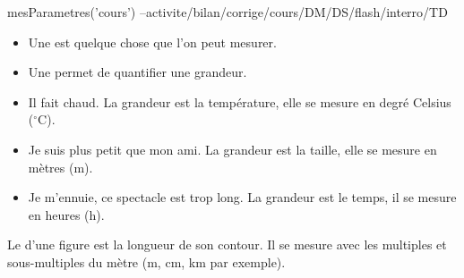 \documentclass{classe-tex3R}
\begin{document}
\begin{luacode}
  mesParametres('cours') --activite/bilan/corrige/cours/DM/DS/flash/interro/TD
\end{luacode}
\parametrage




\begin{definition}
  \begin{itemize}
    \item   Une  est quelque chose que l'on peut mesurer.
    \item Une  permet de quantifier une grandeur.
  \end{itemize}
\end{definition}


\begin{exemple}
    \begin{itemize}
      \item Il fait chaud. La grandeur est la température, elle se mesure en degré Celsius ($^\circ$C).
      \item Je suis plus petit que mon ami. La grandeur est la taille, elle se mesure en mètres (m).
      \item Je m'ennuie, ce spectacle est trop long. La grandeur est le temps, il se mesure en heures (h).
    \end{itemize}
\end{exemple}






\begin{definition}
  Le  d'une figure est la longueur de son contour. Il se mesure avec les multiples et sous-multiples du mètre (m, cm, km par exemple).
\end{definition}


\end{document}
